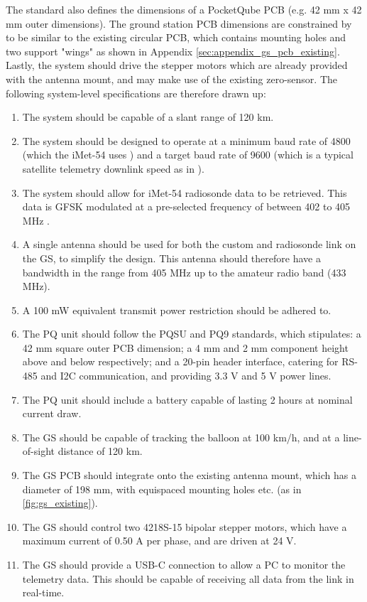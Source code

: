 The standard also defines the dimensions of a PocketQube PCB (e.g. 42 mm x 42 mm outer dimensions). The ground station PCB dimensions are constrained by to be similar to the existing circular PCB, which contains mounting holes and two support "wings" as shown in Appendix \ref{sec:appendix_gs_pcb_existing}. Lastly, the system should drive the stepper motors which are already provided with the antenna mount, and may make use of the existing zero-sensor. The following system-level specifications are therefore drawn up:
\begin{enumerate}
    \item The system should be capable of a slant range of 120 km.
    \item The system should be designed to operate at a minimum baud rate of 4800 (which the iMet-54 uses \cite{datasheet-iMet54}) and a target baud rate of 9600 (which is a typical satellite telemetry downlink speed as in \cite{paper-deployableAntenna}).
    \item The system should allow for iMet-54 radiosonde data to be retrieved. This data is GFSK modulated at a pre-selected frequency of between 402 to 405 MHz \cite{datasheet-iMet54}.
    \item A single antenna should be used for both the custom and radiosonde link on the GS, to simplify the design. This antenna should therefore have a bandwidth in the range from 405 MHz up to the amateur radio band (433 MHz).
    \item A 100 mW equivalent transmit power restriction should be adhered to.
    \item The PQ unit should follow the PQSU and PQ9 standards, which stipulates: a 42 mm square outer PCB dimension; a 4 mm and 2 mm component height above and below respectively; and a 20-pin header interface, catering for RS-485 and I2C communication, and providing 3.3 V and 5 V power lines.
    \item The PQ unit should include a battery capable of lasting 2 hours at nominal current draw.
    \item The GS should be capable of tracking the balloon at 100 km/h, and at a line-of-sight distance of 120 km.
    \item The GS PCB should integrate onto the existing antenna mount, which has a diameter of 198 mm, with equispaced mounting holes etc. (as in \ref{fig:gs_existing}).
    \item The GS should control two 4218S-15 bipolar stepper motors, which have a maximum current of 0.50 A per phase, and are driven at 24 V.
    \item The GS should provide a USB-C connection to allow a PC to monitor the telemetry data. This should be capable of receiving all data from the link in real-time.
\end{enumerate}